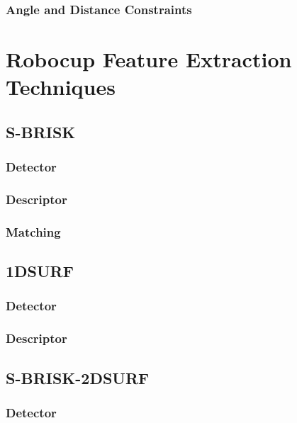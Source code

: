 \documentclass{article}
\begin{document}
\subsubsection{Angle and Distance Constraints}
\label{sec:angleDistanceConstraints}

\section{Robocup Feature Extraction Techniques}
\label{sec:realtimeFeatureExtraction}

\subsection{S-BRISK}
\label{sec:sbrisk}

\subsubsection{Detector}
\label{sec:sbriskDetect}

\subsubsection{Descriptor}
\label{sec:sbriskDescribe}

\subsubsection{Matching}
\label{sec:sbriskMatching}

\subsection{1DSURF}
\label{sec:1dsurf}

\subsubsection{Detector}
\label{sec:1dsurfDetect}

\subsubsection{Descriptor}
\label{sec:1dsurfDescribe}

\subsection{S-BRISK-2DSURF}
\label{sec:brisk2dsurf}

\subsubsection{Detector}
\label{sec:brisk2dsurfDetect}
\end{document}
